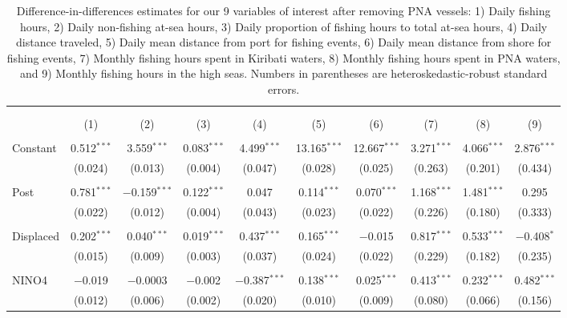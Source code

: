\documentclass[12pt]{article}
\begin{document}
\begin{landscape}
\begin{table}[H] \centering 
  \caption{\label{tab:DID_without_PNA}Difference-in-differences estimates for our 9 variables of interest after removing PNA vessels: 1) Daily fishing hours, 2) Daily non-fishing at-sea hours, 3) Daily proportion of fishing hours to total at-sea hours, 4) Daily distance traveled, 5) Daily mean distance from port for fishing events, 6) Daily mean distance from shore for fishing events, 7) Monthly fishing hours spent in Kiribati waters, 8) Monthly fishing hours spent in PNA waters, and 9) Monthly fishing hours in the high seas. Numbers in parentheses are heteroskedastic-robust standard errors.} 
  \label{} 
\footnotesize 
\begin{tabular}{@{\extracolsep{1pt}}lccccccccc} 
\\[-1.8ex]\hline 
\hline \\[-1.8ex] 
\\[-1.8ex] & (1) & (2) & (3) & (4) & (5) & (6) & (7) & (8) & (9)\\ 
\hline \\[-1.8ex] 
 Constant & 0.512$^{***}$ & 3.559$^{***}$ & 0.083$^{***}$ & 4.499$^{***}$ & 13.165$^{***}$ & 12.667$^{***}$ & 3.271$^{***}$ & 4.066$^{***}$ & 2.876$^{***}$ \\ 
  & (0.024) & (0.013) & (0.004) & (0.047) & (0.028) & (0.025) & (0.263) & (0.201) & (0.434) \\ 
  & & & & & & & & & \\ 
 Post & 0.781$^{***}$ & $-$0.159$^{***}$ & 0.122$^{***}$ & 0.047 & 0.114$^{***}$ & 0.070$^{***}$ & 1.168$^{***}$ & 1.481$^{***}$ & 0.295 \\ 
  & (0.022) & (0.012) & (0.004) & (0.043) & (0.023) & (0.022) & (0.226) & (0.180) & (0.333) \\ 
  & & & & & & & & & \\ 
 Displaced & 0.202$^{***}$ & 0.040$^{***}$ & 0.019$^{***}$ & 0.437$^{***}$ & 0.165$^{***}$ & $-$0.015 & 0.817$^{***}$ & 0.533$^{***}$ & $-$0.408$^{*}$ \\ 
  & (0.015) & (0.009) & (0.003) & (0.037) & (0.024) & (0.022) & (0.229) & (0.182) & (0.235) \\ 
  & & & & & & & & & \\ 
 NINO4 & $-$0.019 & $-$0.0003 & $-$0.002 & $-$0.387$^{***}$ & 0.138$^{***}$ & 0.025$^{***}$ & 0.413$^{***}$ & 0.232$^{***}$ & 0.482$^{***}$ \\ 
  & (0.012) & (0.006) & (0.002) & (0.020) & (0.010) & (0.009) & (0.080) & (0.066) & (0.156) \\ 

\end{tabular}
\end{table}
\end{landscape}
\end{document}
